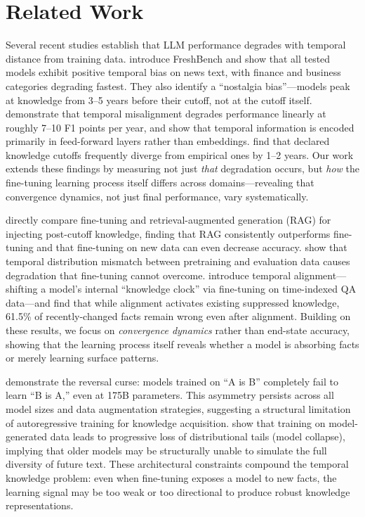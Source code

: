 \section{Related Work}
\label{sec:related}

Several recent studies establish that LLM performance degrades with temporal distance from training data. \citet{li2024outdated} introduce FreshBench and show that all tested models exhibit positive temporal bias on news text, with finance and business categories degrading fastest. They also identify a ``nostalgia bias''---models peak at knowledge from 3--5 years before their cutoff, not at the cutoff itself. \citet{nylund2023time} demonstrate that temporal misalignment degrades performance linearly at roughly 7--10 F1 points per year, and show that temporal information is encoded primarily in feed-forward layers rather than embeddings. \citet{pelcra2025llmlagbench} find that declared knowledge cutoffs frequently diverge from empirical ones by 1--2 years. Our work extends these findings by measuring not just \emph{that} degradation occurs, but \emph{how} the fine-tuning learning process itself differs across domains---revealing that convergence dynamics, not just final performance, vary systematically.

\citet{ovadia2024finetuning} directly compare fine-tuning and retrieval-augmented generation (RAG) for injecting post-cutoff knowledge, finding that RAG consistently outperforms fine-tuning and that fine-tuning on new data can even decrease accuracy. \citet{longpre2023pretrainer} show that temporal distribution mismatch between pretraining and evaluation data causes degradation that fine-tuning cannot overcome. \citet{zhao2024set} introduce temporal alignment---shifting a model's internal ``knowledge clock'' via fine-tuning on time-indexed QA data---and find that while alignment activates existing suppressed knowledge, 61.5\% of recently-changed facts remain wrong even after alignment. Building on these results, we focus on \emph{convergence dynamics} rather than end-state accuracy, showing that the learning process itself reveals whether a model is absorbing facts or merely learning surface patterns.

\citet{berglund2024reversal} demonstrate the reversal curse: models trained on ``A is B'' completely fail to learn ``B is A,'' even at 175B parameters. This asymmetry persists across all model sizes and data augmentation strategies, suggesting a structural limitation of autoregressive training for knowledge acquisition. \citet{shumailov2023curse} show that training on model-generated data leads to progressive loss of distributional tails (model collapse), implying that older models may be structurally unable to simulate the full diversity of future text. These architectural constraints compound the temporal knowledge problem: even when fine-tuning exposes a model to new facts, the learning signal may be too weak or too directional to produce robust knowledge representations.

